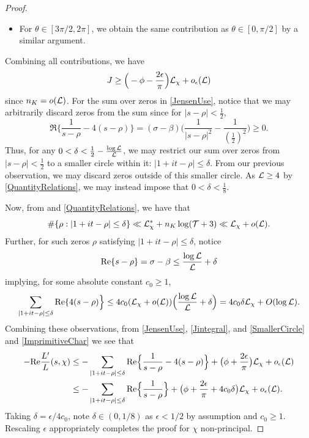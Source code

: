 \documentclass[12pt,psamsfonts]{amsart}
\theoremstyle{definition}
\theoremstyle{remark}
\numberwithin{equation}{section}
\begin{document}
\begin{proof}
\begin{itemize}
\item For $\theta \in [3\pi/2, 2\pi]$, we obtain the same contribution as $\theta \in [0,\pi/2]$ by a similar argument. 
\end{itemize} 
Combining all contributions, we have
\begin{equation}
J \geq  \Big(- \phi - \frac{2\epsilon}{\pi} \Big)\mathcal{L}_{\chi}  + o_{\epsilon}(\mathcal{L})
\label{Jintegral}
\end{equation}
since $n_K = o(\mathcal{L})$. For the sum over zeros in \eqref{JensenUse}, notice that we may arbitrarily discard zeros from the sum since for $|s-\rho| < \tfrac{1}{2}$, 
\[
\Re\Big\{ \frac{1}{s-\rho} - 4(s-\rho) \Big\} = (\sigma-\beta) \Big( \frac{1}{|s-\rho|^2} - \frac{1}{(\tfrac{1}{2})^2} \Big) \geq 0. 
\]
Thus, for any $0 < \delta < \tfrac{1}{2}- \tfrac{\log \mathcal{L}}{\mathcal{L}}$, we may restrict our sum over zeros from $|s-\rho| < \tfrac{1}{2}$ to a smaller circle within it: $|1+it-\rho| \leq \delta$. From our previous observation, we may discard zeros outside of this smaller circle. As $\mathcal{L} \geq 4$ by \cref{QuantityRelations}, we may instead impose that $0 < \delta < \tfrac{1}{8}$.

Now, from \cite[Lemma 2.1]{LMO} and \cref{QuantityRelations}, we have that 
\[
\#\{ \rho : |1+it-\rho| \leq \delta\} \ll  \mathcal{L}_{\chi}^* + n_K \log(\mathcal{T} +3)  \ll \mathcal{L}_{\chi} + o(\mathcal{L}).
\]
Further, for such zeros $\rho$ satisfying $|1+it-\rho| \leq \delta$, notice
\[
\mathrm{Re}\{ s-\rho \} = \sigma-\beta \leq   \frac{\log \mathcal{L}}{\mathcal{L}} + \delta 
\]
implying, for some absolute constant $c_0 \geq 1$, 
\begin{equation}
\sum_{|1+it-\rho| \leq \delta} \mathrm{Re}\{ 4(s-\rho) \Big\} \leq 4c_0(\mathcal{L}_{\chi} + o(\mathcal{L}) ) \Big(\frac{\log \mathcal{L}}{\mathcal{L}} + \delta \Big) = 4 c_0 \delta \mathcal{L}_{\chi} + O(\log \mathcal{L}). 
\label{SmallerCircle}
\end{equation}
Combining these observations, from \eqref{JensenUse}, \eqref{Jintegral}, and \eqref{SmallerCircle} and \cref{ImprimitiveChar} we see that
\begin{align*}
-\mathrm{Re} \frac{L'}{L}(s,\chi) 
&  \leq -\sum_{|1+it-\rho| \leq \delta} \mathrm{Re}\Big\{ \frac{1}{s-\rho} - 4(s-\rho) \Big\}  + \big(  \phi + \frac{2 \epsilon}{\pi} \big)\mathcal{L}_{\chi}  + o_{\epsilon}(\mathcal{L})\\
&   \leq -\sum_{|1+it-\rho| \leq \delta} \mathrm{Re}\Big\{ \frac{1}{s-\rho} \Big\}  +  \big(  \phi + \frac{2\epsilon}{\pi} + 4c_0 \delta \big)\mathcal{L}_{\chi}  + o_{\epsilon}(\mathcal{L}). 
\end{align*}
Taking $\delta = \epsilon/4c_0$, note $\delta \in (0,1/8)$ as $\epsilon < 1/2$ by assumption and $c_0 \geq 1$. Rescaling $\epsilon$ appropriately completes the proof for $\chi$ non-principal.


\end{proof}
\end{document}
